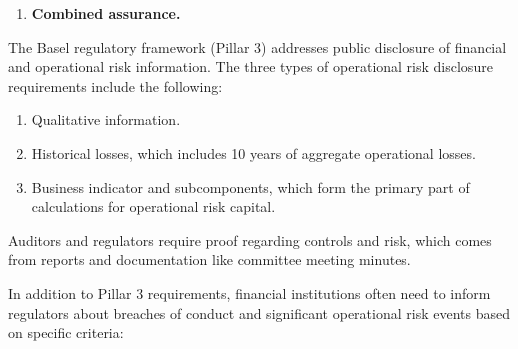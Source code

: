 \begin{enumerate}
\item[\textcolor{rust}{\sffamily\bfseries 8.}] \textbf{Combined assurance.}
\end{enumerate}



The Basel regulatory framework (Pillar 3) addresses public disclosure of financial
and operational risk information. The three types of operational risk disclosure
requirements include the following:

\begin{enumerate}
\item[\textcolor{rust}{\sffamily\bfseries 1.}] Qualitative information.
\item[\textcolor{rust}{\sffamily\bfseries 2.}] Historical losses, which includes
10 years of aggregate operational losses.
\item[\textcolor{rust}{\sffamily\bfseries 3.}] Business indicator and
subcomponents, which form the primary part of calculations for operational risk
capital.
\end{enumerate}

Auditors and regulators require proof regarding controls and risk, which comes from
reports and documentation like committee meeting minutes.

In addition to Pillar 3 requirements, financial institutions often need to inform
regulators about breaches of conduct and significant operational risk events based
on specific criteria:

